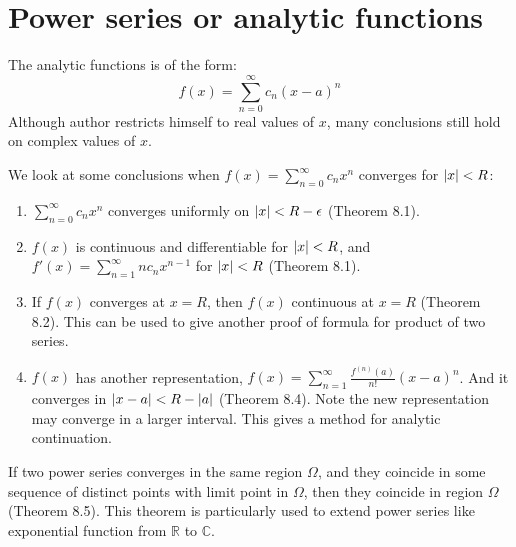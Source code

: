\section{Power series or analytic functions}
The analytic functions is of the form:
\begin{equation*}
    f(x)=\sum_{n=0}^\infty c_n(x-a)^n
\end{equation*}
Although author restricts himself to real values of $x$, many conclusions still hold on complex values of $x$.\par
We look at some conclusions when $f(x)=\sum_{n=0}^\infty c_nx^n$ converges for $\left\lvert x\right\rvert<R$:
\begin{enumerate}
    \item $\sum_{n=0}^\infty c_nx^n$ converges uniformly on $\left\lvert x\right\rvert<R-\epsilon$ (Theorem 8.1).
    \item $f(x)$ is continuous and differentiable for $\left\lvert x\right\rvert<R$, and $f'(x)=\sum_{n=1}^\infty nc_nx^{n-1}$ for $\left\lvert x\right\rvert<R$ (Theorem 8.1).
    \item If $f(x)$ converges at $x=R$, then $f(x)$ continuous at $x=R$ (Theorem 8.2). This can be used to give another proof of formula for product of two series.
    \item $f(x)$ has another representation, $f(x)=\sum_{n=1}^\infty\frac{f^{(n)}(a)}{n!}(x-a)^n$. And it converges in $\left\lvert x-a\right\rvert<R-\left\lvert a\right\rvert$ (Theorem 8.4). Note the new representation may converge in a larger interval. This gives a method for analytic continuation.
\end{enumerate}\par
If two power series converges in the same region $\Omega$, and they coincide in some sequence of distinct points with limit point in $\Omega$, then they coincide in region $\Omega$ (Theorem 8.5).
This theorem is particularly used to extend power series like exponential function from $\mathbb{R}$ to $\mathbb{C}$.
